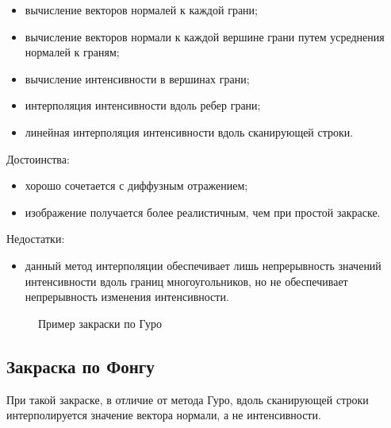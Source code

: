 \begin{itemize}
	\item вычисление векторов нормалей к каждой грани;
	\item вычисление векторов нормали к каждой вершине грани путем усреднения нормалей к граням;
	\item вычисление интенсивности в вершинах грани;
	\item интерполяция интенсивности вдоль ребер грани;
	\item линейная интерполяция интенсивности вдоль сканирующей строки.
\end{itemize}

Достоинства:

\begin{itemize}
	\item хорошо сочетается с диффузным отражением;
	\item изображение получается более реалистичным, чем при простой закраске.
\end{itemize}

Недостатки:

\begin{itemize}
	\item данный метод интерполяции обеспечивает лишь непрерывность значений интенсивности вдоль границ многоугольников, но не обеспечивает непрерывность изменения интенсивности.
\end{itemize}

\begin{figure}[ph!]
	\caption{Пример закраски по Гуро}
	\label{fig:draw_guro}
\end{figure}

\subsection{Закраска по Фонгу}

При такой закраске, в отличие от метода Гуро, вдоль сканирующей строки интерполируется значение вектора нормали, а не интенсивности. 

